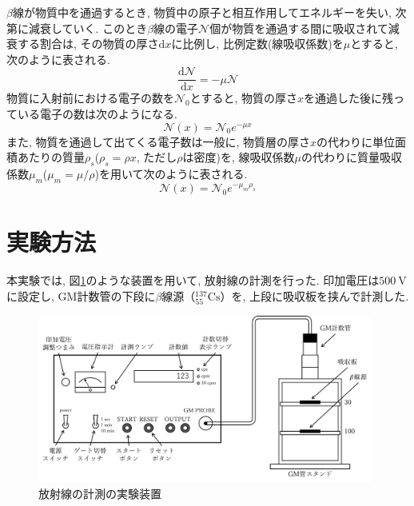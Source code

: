 \documentclass{jarticle}
\begin{document}
$\beta$線が物質中を通過するとき, 物質中の原子と相互作用してエネルギーを失い, 次第に減衰していく.
このとき$\beta$線の電子$\mathcal{N}$個が物質を通過する間に吸収されて減衰する割合は, その物質の厚さ$\mathrm{d}x$に比例し, 比例定数(線吸収係数)を$\mu$とすると, 次のように表される.
\begin{equation}
  \frac{\mathrm{d}\mathcal{N}}{\mathrm{d}x} = -\mu \mathcal{N}
\end{equation}
物質に入射前における電子の数を$\mathcal{N}_0$とすると, 物質の厚さ$x$を通過した後に残っている電子の数は次のようになる.
\begin{equation}
  \mathcal{N}(x) = \mathcal{N}_0 e^{-\mu x}
  \label{eq:electrons-passing}
\end{equation}
また, 物質を通過して出てくる電子数は一般に, 物質層の厚さ$x$の代わりに単位面積あたりの質量$\rho_s$($\rho_s=\rho x$, ただし$\rho$は密度)を, 線吸収係数$\mu$の代わりに質量吸収係数$\mu_m$($\mu_m=\mu/\rho$)を用いて次のように表される.
\begin{equation}
  \mathcal{N}(x) = \mathcal{N}_0 e^{-\mu_m \rho_s}
\end{equation}



\section{実験方法}


本実験では, 図\ref{fg:radiation-method}のような装置を用いて, 放射線の計測を行った.
印加電圧は$500\ \mathrm{V}$に設定し, GM計数管の下段に$\beta$線源（$^{137}_{55}\mathrm{Cs}$）を, 上段に吸収板を挟んで計測した.

\begin{figure}[H]
  \begin{center}
    \includegraphics[width=110mm]{experimental_equipment.png}
    \caption{放射線の計測の実験装置}
    \label{fg:radiation-method}
  \end{center}
\end{figure}
\end{document}
